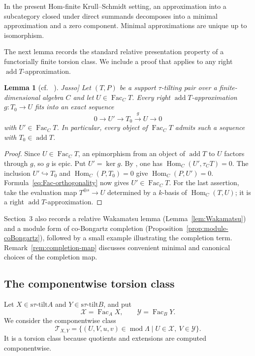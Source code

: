\documentclass[11pt,reqno]{amsart}
\newtheorem{lemma}[theorem]{Lemma}
\theoremstyle{definition}
\theoremstyle{remark}
\newcommand{\modu}{\operatorname{mod}}
\newcommand{\Fac}{\operatorname{Fac}}
\newcommand{\addc}{\operatorname{add}}
\newcommand{\Hom}{\operatorname{Hom}}
\newcommand{\stau}{\mathrm{s}\tau\text{-}\mathrm{tilt}}
\newcommand{\JassoRelativeCitation}{%
  \cite[Proposition~2.1(e)]{Jasso}}
\numberwithin{equation}{section}
\begin{document}
In the present Hom-finite Krull--Schmidt setting, an approximation into a
subcategory closed under direct summands decomposes into a minimal
approximation and a zero component.  Minimal approximations are unique up
to isomorphism.

The next lemma records the standard relative presentation property of a
functorially finite torsion class.  We include a proof that applies to any
right $\addc T$-approximation.

\begin{lemma}[cf.~\JassoRelativeCitation]
\label{lem:relative-covers}
Let $(T,P)$ be a support $\tau$-tilting pair over a finite-dimensional
algebra $C$ and let $U\in\Fac_CT$.  Every right $\addc T$-approximation
$g:T_0\to U$ fits into an exact sequence
\[
 0\longrightarrow U'\longrightarrow T_0\xrightarrow{g}U\longrightarrow0
\]
with $U'\in\Fac_CT$.  In particular, every object of $\Fac_CT$ admits
such a sequence with $T_0\in\addc T$.
\end{lemma}

\begin{proof}
Since $U\in\Fac_CT$, an epimorphism from an object of $\addc T$ to $U$
factors through $g$, so $g$ is epic.  Put $U'=\ker g$.
By \cite[Lemma~2.6]{AIR}, one has $\Hom_C(U',\tau_CT)=0$.
The inclusion $U'\hookrightarrow T_0$ and $\Hom_C(P,T_0)=0$ give
$\Hom_C(P,U')=0$.  Formula~\eqref{eq:Fac-orthogonality} now gives
$U'\in\Fac_CT$.  For the last assertion, take the evaluation map
$T^{\oplus s}\to U$ determined by a $k$-basis of $\Hom_C(T,U)$; it is a
right $\addc T$-approximation.
\end{proof}

Section~3 also records a relative Wakamatsu lemma
(Lemma~\ref{lem:Wakamatsu}) and a module form of co-Bongartz completion
(Proposition~\ref{prop:module-coBongartz}), followed by a small example
illustrating the completion term.  Remark~\ref{rem:completion-map}
discusses convenient minimal and canonical choices of the completion map.

\subsection{The componentwise torsion class}

Let $X\in\stau A$ and $Y\in\stau B$, and put
\[
 \mathcal X=\Fac_AX,
 \qquad
 \mathcal Y=\Fac_BY.
\]
We consider the componentwise class
\[
 \mathcal T_{X,Y}
 =\{(U,V,u,v)\in\modu\Lambda\mid U\in\mathcal X,
                                      \ V\in\mathcal Y\}.
\]
It is a torsion class because quotients and extensions are computed
componentwise.
\end{document}
